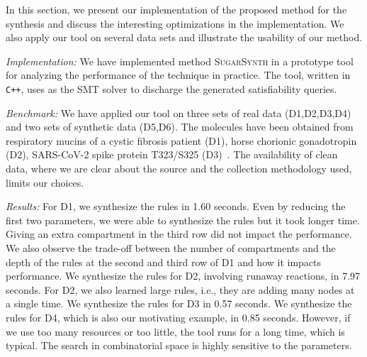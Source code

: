 In this section, we  present our implementation of the proposed method for the synthesis
and discuss the interesting optimizations in the implementation.
%
We also apply our tool on several data sets and illustrate the usability of our method.

{\em Implementation:} 
We have implemented method \textsc{SugarSynth} in a prototype tool {\ourtool} for
analyzing the performance of the technique in practice.
%
The tool, written in {\tt C++}, uses {\zthree}\cite{z3} as the SMT solver
to discharge the generated satisfiability queries.
%


{\em Benchmark: }
We have applied our tool on three sets of real data (D1,D2,D3,D4) and two sets of synthetic data (D5,D6). The molecules have been obtained from
respiratory mucins of a cystic fibrosis patient (D1),
horse chorionic gonadotropin (D2), SARS-CoV-2 spike protein T323/S325 (D3)~\cite{Jaiman2018,SarsCov2}.
The availability of clean data, where we are clear about the source and the collection
methodology used, limits our choices.




{\em Results:}
For D1, we synthesize the rules in 1.60 seconds. Even by reducing the first two parameters, we were able to synthesize the rules but it took longer time.
Giving an extra compartment in the third row did not impact the performance.  We also observe the trade-off between the number of compartments
and the depth of the rules at the second and third row of D1 and how it impacts performance.
We synthesize the rules for D2, involving runaway reactions,  in 7.97 seconds.
For D2, we also learned large rules, i.e., they are adding many nodes at a single time.
We synthesize the rules for D3 in 0.57 seconds. We synthesize the rules for D4, which is also our motivating example, in 0.85 seconds.
However, if we use too many resources or too little, the tool runs for a long time,
which is typical. The search in combinatorial space is highly sensitive to the parameters.

